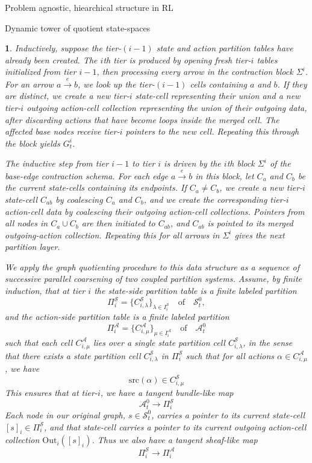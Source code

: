 \documentclass[11pt]{article}
\newtheorem{ermark}[subsubsection]{}
\begin{document}
\begin{section}{Problem agnostic, hiearchical structure in RL}
\begin{subsection}{Dynamic tower of quotient state-spaces}
\begin{ermark}
Inductively, suppose the tier-$(i-1)$ state and action partition tables have already been created. The $i$th tier is produced by opening fresh tier-$i$ tables initialized from tier $i-1$, then processing every arrow in the contraction block $\Sigma^i$. For an arrow $a\xrightarrow{\ e\ }b$, we look up the tier-$(i-1)$ cells containing $a$ and $b$. If they are distinct, we create a new tier-$i$ state-cell representing their union and a new tier-$i$ outgoing action-cell collection representing the union of their outgoing data, after discarding actions that have become loops inside the merged cell. The affected base nodes receive tier-$i$ pointers to the new cell. Repeating this through the block yields $G_t^i$. 

The inductive step from tier $i-1$ to tier $i$ is driven by the $i$th block $\Sigma^i$ of the base-edge contraction schema. For each edge $a\xrightarrow{\ e\ }b$ in this block, let $C_a$ and $C_b$ be the current state-cells containing its endpoints. If $C_a\neq C_b$, we create a new tier-$i$ state-cell $C_{ab}$ by coalescing $C_a$ and $C_b$, and we create the corresponding tier-$i$ action-cell data by coalescing their outgoing action-cell collections. Pointers from all nodes in $C_a\cup C_b$ are then initiated to $C_{ab}$, and $C_{ab}$ is pointed to its merged outgoing-action collection. Repeating this for all arrows in $\Sigma^i$ gives the next partition layer.

We apply the graph quotienting procedure to this data structure as a sequence of successive parallel coarsening of two coupled partition systems. Assume, by finite induction, that at tier $i$ the \emph{state-side partition table} is a finite labeled partition
\[
\Pi_i^{\mathcal S}=\{C_{i,\lambda}^{\mathcal S}\}_{\lambda\in I_i^{\mathcal S}}
\quad\text{of}\quad\mathcal{S}_t^0,
\]
and the \emph{action-side partition table} is a finite labeled partition
\[
\Pi_i^{\mathcal A}=\{C_{i,\mu}^{\mathcal A}\}_{\mu\in I_i^{\mathcal A}}
\quad\text{of}\quad\mathcal{A}_t^0
\]
such that each cell $C_{i,\mu}^{\mathcal A}$ lies over a single state partition cell $C_{i,\lambda}^{\mathcal S}$, in the sense that there exists a state partition cell $C_{i,\lambda}^{\mathcal S}$ in $\Pi_i^{\mathcal S}$ such that for all actions $\alpha\in C_{i,\mu}^{\mathcal A}$, we have
	$$
	\text{src}(\alpha)\in C_{i,\mu}^{\mathcal S}
	$$
This ensures that at tier-$i$, we have a tangent bundle-like map 
$$
\mathcal{A}^{0}_{t}\longrightarrow\Pi_i^{\mathcal S}
$$
Each node in our original graph, $s\in\mathcal{S}_t^0$, carries a pointer to its current state-cell $[s]_i\in\Pi_i^{\mathcal S}$, and that state-cell carries a pointer to its current outgoing action-cell collection $\mathrm{Out}_i([s]_i)$. Thus we also have a tangent sheaf-like map
$$
\Pi_i^{\mathcal S}\longrightarrow\Pi_i^{\mathcal A}
$$


\end{ermark}
\end{subsection}
\end{section}
\end{document}
